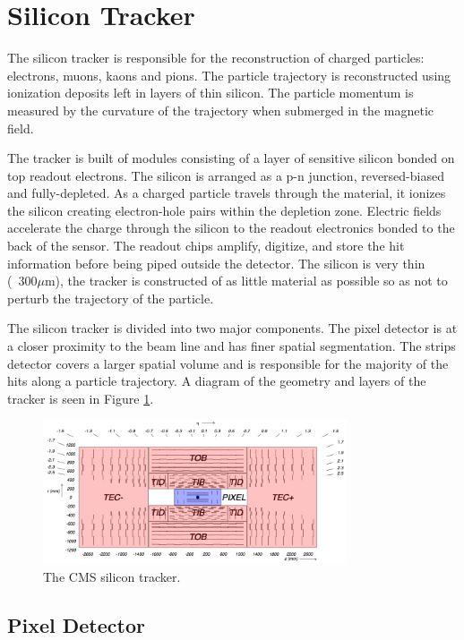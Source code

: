 \section{Silicon Tracker}

The silicon tracker is responsible for the reconstruction of charged particles: electrons, muons, kaons and pions. The particle trajectory is reconstructed using ionization deposits left in layers of thin silicon. The particle momentum is measured by the curvature of the trajectory when submerged in the magnetic field.\cite{trackertdr} \cite{trackertdradd}

The tracker is built of modules consisting of a layer of sensitive silicon bonded on top readout electrons. The silicon is arranged as a p-n junction, reversed-biased and fully-depleted. As a charged particle travels through the material, it ionizes the silicon creating electron-hole pairs within the depletion zone. Electric fields accelerate the charge through the silicon to the readout electronics bonded to the back of the sensor. The readout chips amplify, digitize, and store the hit information before being piped outside the detector. The silicon is very thin (~300$\mu$m), the tracker is constructed of as little material as possible so as not to perturb the trajectory of the particle.

The silicon tracker is divided into two major components. The pixel detector is at a closer proximity to the beam line and has finer spatial segmentation. The strips detector covers a larger spatial volume and is responsible for the majority of the hits along a particle trajectory. A diagram of the geometry and layers of the tracker is seen in Figure \ref{fig:tracker}.

\begin{figure}[hb!]
\centering
\includegraphics[width=0.8\textwidth]{figs/img_cms_tracker_view.png}
\caption{The CMS silicon tracker.}
\label{fig:tracker}
\end{figure}

\subsection{Pixel Detector}

